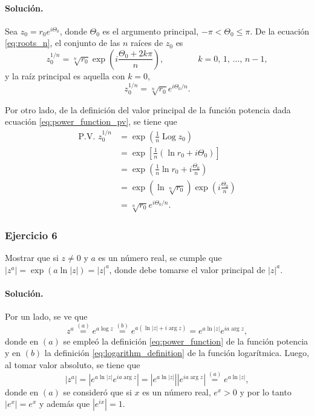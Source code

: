 \documentclass[a4paper]{report}
\DeclareMathOperator{\Log}{Log}
\begin{document}
\paragraph{Solución.} Sea \(z_0=r_0e^{i\Theta_0}\), donde \(\Theta_0\) es el argumento principal, \(-\pi<\Theta_0\leq\pi\). De la ecuación \ref{eq:roots_n}, el conjunto de las \(n\) raíces de \(z_0\) es
\[
 z_0^{1/n}=\sqrt[n]{r_0}\exp\left(i\frac{\Theta_0+2k\pi}{n}\right),
 \qquad\qquad k=0,\,1,\,\dots,\,n-1,
\]
y la raíz principal es aquella con \(k=0\),
\[
 z_0^{1/n}=\sqrt[n]{r_0}e^{i\Theta_0/n}.
\]

Por otro lado, de la definición del valor principal de la función potencia dada ecuación \ref{eq:power_function_pv}, se tiene que
\begin{align*}
 \textrm{P.V. }z_0^{1/n}&=\exp\left(\frac{1}{n}\Log z_0\right)\\
  &=\exp\left[\frac{1}{n}(\ln r_0+i\Theta_0)\right]\\
  &=\exp\left(\frac{1}{n}\ln r_0+i\frac{\Theta_0}{n}\right)\\
  &=\exp\left(\ln\sqrt[n]{r_0}\right)\exp\left(i\frac{\Theta_0}{n}\right)\\
  &=\sqrt[n]{r_0}e^{i\Theta_0/n}.
\end{align*}

\subsubsection{Ejercicio 6}

Mostrar que si \(z\neq0\) y \(a\) es un número real, se cumple que \(|z^a|=\exp(a\ln|z|)=|z|^a\), donde debe tomarse el valor principal de \(|z|^a\).

\paragraph{Solución.} Por un lado, se ve que 
\begin{equation}\label{eq:exercise_36_06_4}
  z^a\overset{(a)}{=}e^{a\log z}\overset{(b)}{=}e^{a(\ln|z|+i\arg z)}=e^{a\ln|z|}e^{ia\arg z},
\end{equation}
donde en \((a)\) se empleó la definición \ref{eq:power_function} de la función potencia y en \((b)\) la definición \ref{eq:logarithm_definition} de la función logarítmica. Luego, al tomar valor absoluto, se tiene que 
\begin{equation}\label{eq:exercise_36_06_1}
  |z^a|=|e^{a\ln|z|}e^{ia\arg z}|=|e^{a\ln|z|}||e^{ia\arg z}|\overset{(a)}{=}e^{a\ln|z|},
\end{equation}
donde en \((a)\) se consideró que si \(x\) es un número real, \(e^x>0\) y por lo tanto \(|e^x|=e^x\) y además que \(|e^{ix}|=1\).
\end{document}

